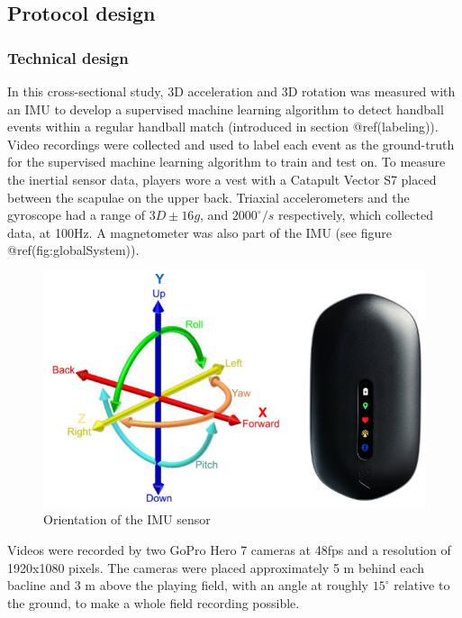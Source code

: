 \documentclass[
]{article}
\begin{document}
\hypertarget{protocol-design}{%
\subsection{Protocol design}\label{protocol-design}}

\hypertarget{technical-design}{%
\subsubsection{Technical design}\label{technical-design}}

In this cross-sectional study, 3D acceleration and 3D rotation was
measured with an IMU to develop a supervised machine learning algorithm
to detect handball events within a regular handball match (introduced in
section @ref(labeling)). Video recordings were collected and used to
label each event as the ground-truth for the supervised machine learning
algorithm to train and test on. To measure the inertial sensor data,
players wore a vest with a Catapult Vector S7 placed between the
scapulae on the upper back. Triaxial accelerometers and the gyroscope
had a range of \(3D \pm 16g\), and \(2000^{\circ}/s\) respectively,
which collected data, at 100Hz. A magnetometer was also part of the IMU
(see figure @ref(fig:globalSystem)).

\begin{figure}
\includegraphics[width=1\linewidth]{img/globalSystem} \caption{Orientation of the IMU sensor}\label{fig:globalSystem}
\end{figure}

Videos were recorded by two GoPro Hero 7 cameras at 48fps and a
resolution of 1920x1080 pixels. The cameras were placed approximately 5
m behind each bacline and 3 m above the playing field, with an angle at
roughly \(15^{\circ}\) relative to the ground, to make a whole field
recording possible.
\end{document}
